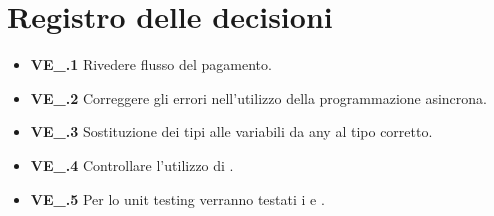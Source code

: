 \section{Registro delle decisioni}
\begin{itemize}
	\item \textbf{VE\_\Data.1} Rivedere flusso del pagamento.
	\item \textbf{VE\_\Data.2} Correggere gli errori nell'utilizzo della programmazione asincrona.
	\item \textbf{VE\_\Data.3} Sostituzione dei tipi alle variabili da any al tipo corretto.
	\item \textbf{VE\_\Data.4} Controllare l'utilizzo di .
	\item \textbf{VE\_\Data.5} Per lo unit testing verranno testati i   e .
\end{itemize}
